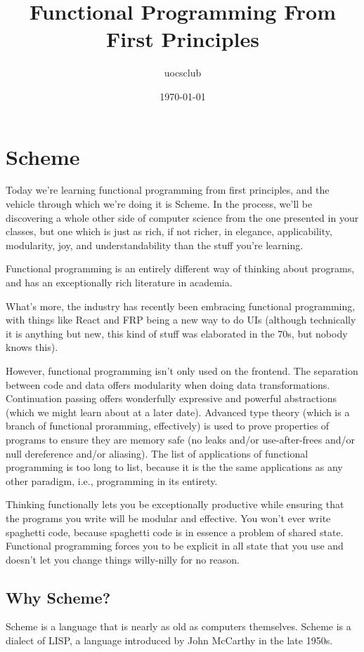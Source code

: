 \documentclass[11pt]{article}
\author{uocsclub}
\date{\today}
\title{Functional Programming From First Principles}
\begin{document}
\maketitle
\tableofcontents


\section{Scheme}
\label{sec:org027ee5e}
Today we're learning functional programming from first principles,
and the vehicle through which we're doing it is Scheme. In the
process, we'll be discovering a whole other side of computer science
from the one presented in your classes, but one which is just as
rich, if not richer, in elegance, applicability, modularity, joy,
and understandability than the stuff you're learning.

Functional programming is an entirely different way of thinking
about programs, and has an exceptionally rich literature in academia.

What's more, the industry has recently been embracing functional
programming, with things like React and FRP being a new way to do
UIs (although technically it is anything but new, this kind of stuff
was elaborated in the 70s, but nobody knows this).

However, functional programming isn't only used on the frontend. The
separation between code and data offers modularity when doing data
transformations. Continuation passing offers wonderfully expressive
and powerful abstractions (which we might learn about at a later
date). Advanced type theory (which is a branch of functional
proramming, effectively) is used to prove properties of programs to
ensure they are memory safe (no leaks and/or use-after-frees and/or
null dereference and/or aliasing). The list of applications of
functional programming is too long to list, because it is the the
same applications as any other paradigm, i.e., programming in its
entirety.

Thinking functionally lets you be exceptionally productive while
ensuring that the programs you write will be modular and
effective. You won't ever write spaghetti code, because spaghetti
code is in essence a problem of shared state. Functional programming
forces you to be explicit in all state that you use and doesn't let
you change things willy-nilly for no reason.


\subsection{Why Scheme?}
\label{sec:org1646b8b}
Scheme is a language that is nearly as old as computers
themselves. Scheme is a dialect of LISP, a language introduced by
John McCarthy in the late 1950s.
\end{document}
